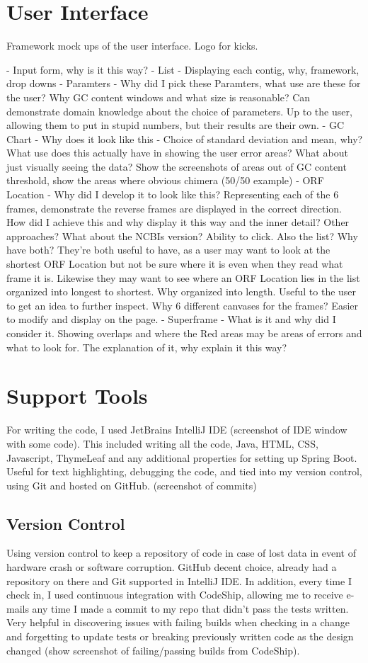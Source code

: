\section{User Interface}
Framework mock ups of the user interface. Logo for kicks.

- Input form, why is it this way?
- List - Displaying each contig, why, framework, drop downs
- Paramters - Why did I pick these Paramters, what use are these for the user? Why GC content windows and what size is reasonable? Can demonstrate domain knowledge about the choice of parameters. Up to the user, allowing them to put in stupid numbers, but their results are their own.
- GC Chart - Why does it look like this - Choice of standard deviation and mean, why? What use does this actually have  in showing the user error areas? What about just visually seeing the data? Show the screenshots of areas out of GC content threshold, show the areas where obvious chimera (50/50 example)
- ORF Location - Why did I develop it to look like this? Representing each of the 6 frames, demonstrate the reverse frames are displayed in the correct direction. How did I achieve this and why display it this way and the inner detail? Other approaches? What about the NCBIs version? Ability to click. Also the list? Why have both? They're both useful to have, as a user may want to look at the shortest ORF Location but not be sure where it is even when they read what frame it is. Likewise they may want to see where an ORF Location lies in the list organized into longest to shortest. Why organized into length. Useful to the user to get an idea to further inspect. Why 6 different canvases for the frames? Easier to modify and display on the page.
- Superframe - What is it and why did I consider it. Showing overlaps and where the Red areas may be areas of errors and what to look for. The explanation of it, why explain it this way? 

\section{Support Tools}
For writing the code, I used JetBrains IntelliJ IDE (screenshot of IDE window with some code). This included writing all the code, Java, HTML, CSS, Javascript, ThymeLeaf and any additional properties for setting up Spring Boot. Useful for text highlighting, debugging the code, and tied into my version control, using Git and hosted on GitHub. (screenshot of commits)
\subsection{Version Control}
Using version control to keep a repository of code in case of lost data in event of hardware crash or software corruption. GitHub decent choice, already had a repository on there and Git supported in IntelliJ IDE. In addition, every time I check in, I used continuous integration with CodeShip, allowing me to receive e-mails any time I made a commit to my repo that didn't pass the tests written. Very helpful in discovering issues with failing builds when checking in a change and forgetting to update tests or breaking previously written code as the design changed (show screenshot of failing/passing builds from CodeShip).